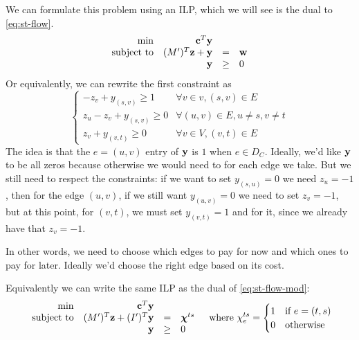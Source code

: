 \documentclass[12pt]{extarticle}
\renewcommand{\vec}[1]{\bvec{#1}}
\begin{document}
We can formulate this problem using an ILP, which we will see is the dual to \cref{eq:st-flow}.
\begin{equation}
	\begin{array}{rrcl}
		\min              & \vec c^T \vec y        &      &        \\
		\text{subject to} & (M')^T \vec z + \vec y & =    & \vec w \\
		                  & \vec y                 & \geq & 0
	\end{array}
\end{equation}
Or equivalently, we can rewrite the first constraint as
\begin{equation}
	\begin{cases}
		-z_v + y_{(s, v)} \geq 1      & \forall v \in v, (s, v) \in E            \\
		z_u - z_v + y_{(s, v)} \geq 0 & \forall (u, v) \in E, u \neq s, v \neq t \\
		z_v + y_{(v, t)} \geq 0       & \forall v \in V, (v, t) \in E
	\end{cases}
	\label{eq:min-cut-alt-constraints}
\end{equation}
The idea is that the $e=(u, v)$ entry of $\vec y$ is $1$ when $e \in D_C$. Ideally, we'd like
$\vec y$ to be all zeros because otherwise we would need to  for each edge we take.
But we still need to respect the constraints: if we want to set $y_{(s, u)} = 0$ we need $z_u = -1$,
then for the  edge $(u, v)$, if we still want $y_{(u, v)} = 0$ we need to set $z_v = -1$,
but at this point, for $(v, t)$, we must set $y_{(v, t)} = 1$ and  for it, since we already
have that $z_v = -1$.

In other words, we need to choose which edges to pay for now and which ones to pay for later.
Ideally we'd choose the right edge based on its cost.

Equivalently we can write the same ILP as the dual of \cref{eq:st-flow-mod}:
\begin{equation}
	\begin{array}{rrcl}
		\min              & \vec c^T \vec y              &      &                \\
		\text{subject to} & (M')^T \vec z + (I')^T\vec y & =    & \vec \chi^{ts} \\
		                  & \vec y                       & \geq & 0
	\end{array} \quad \text{where }
	\chi^{ts}_e = \begin{cases}
		1 & \text{if } e = (t, s) \\
		0 & \text{otherwise}
	\end{cases}
\end{equation}
\end{document}
